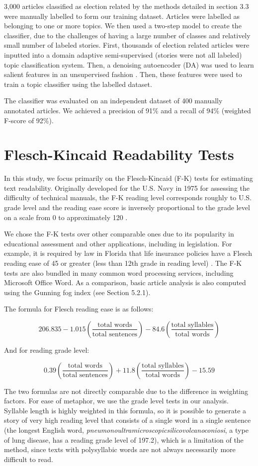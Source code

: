  3,000 articles classified as election related by the methods detailed in section 3.3 were manually labelled to form our training dataset. Articles were labelled as belonging to one or more topics. We then used a two-step model to create the classifier, due to the challenges of having a large number of classes and relatively small number of labeled stories. First, thousands of election related articles were inputted into a domain adaptive semi-supervised (stories were not all labeled) topic classification system. Then, a denoising autoencoder (DA) was used to learn salient features in an unsupervised fashion \cite{vincent2008extracting}. Then, these features were used to train a topic classifier using the labelled dataset.

The classifier was evaluated on an independent dataset of 400 manually annotated articles. We achieved a precision of 91\% and a recall of 94\% (weighted F-score of 92\%).

\section{Flesch-Kincaid Readability Tests} 
In this study, we focus primarily on the Flesch-Kincaid (F-K) tests for estimating text readability. Originally developed for the U.S. Navy in 1975 for assessing the difficulty of technical manuals, the F-K reading level corresponds roughly to U.S. grade level and the reading ease score is inversely proportional to the grade level on a scale from 0 to approximately 120 \cite{kincaid1975derivation}.

We chose the F-K tests over other comparable ones due to its popularity in educational assessment and other applications, including in legislation. For example, it is required by law in Florida that life insurance policies have a Flesch reading ease of 45 or greater (less than 12th grade in reading level) \cite{Statu37online}. The F-K tests are also bundled in many common word processing services, including Microsoft Office Word. As a comparison, basic article analysis is also computed using the Gunning fog index (see Section 5.2.1).

The formula for Flesch reading ease is as follows:

$$206.835 - 1.015 \left( \frac{\mbox{total words}}{\mbox{total sentences}} \right) - 84.6 \left( \frac{\mbox{total syllables}}{\mbox{total words}} \right)$$

And for reading grade level:

$$0.39 \left ( \frac{\mbox{total words}}{\mbox{total sentences}} \right ) + 11.8 \left ( \frac{\mbox{total syllables}}{\mbox{total words}} \right ) - 15.59$$
 
The two formulas are not directly comparable due to the difference in weighting factors. For ease of metaphor, we use the grade level tests in our analysis. Syllable length is highly weighted in this formula, so it is possible to generate a story of very high reading level that consists of a single word in a single sentence (the longest English word, \emph{pneumonoultramicroscopicsilicovolcanoconiosi}, a type of lung disease, has a reading grade level of 197.2), which is a limitation of the method, since texts with polysyllabic words are not always necessarily more difficult to read.
  